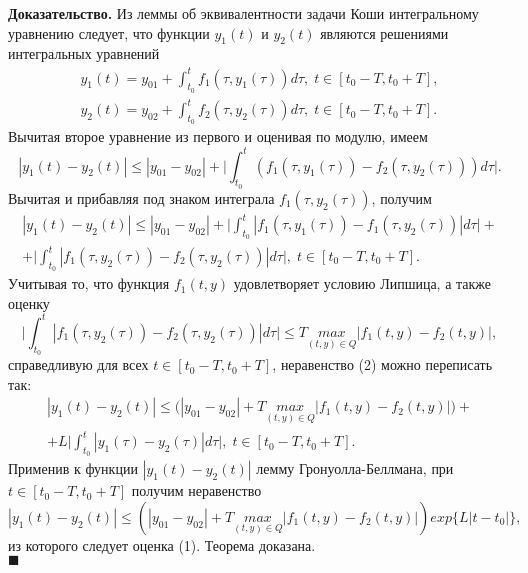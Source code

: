 \textbf{Доказательство.} Из леммы об эквивалентности задачи Коши интегральному уравнению следует, что функции $y_1(t)$ и $y_2(t)$ являются решениями интегральных уравнений
\begin{equation*}
\begin{split}
y_1(t)=y_{01}+\int_{t_0}^t f_1(\tau , y_1(\tau))d\tau , \;t\in [t_0-T, t_0+T],\\
y_2(t)=y_{02}+\int_{t_0}^t f_2(\tau , y_2(\tau))d\tau , \;t\in [t_0-T, t_0+T].
\end{split}
\end{equation*}
Вычитая второе уравнение из первого и оценивая по модулю, имеем
\begin{equation*}
|y_1(t)-y_2(t)|\leq |y_{01}-y_{02}|+\big| \int_{t_0}^t (f_1(\tau , y_1(\tau))- f_2(\tau , y_2(\tau)))d\tau \big|.
\end{equation*}
Вычитая и прибавляя под знаком интеграла $f_1(\tau,y_2(\tau))$, получим
\begin{equation*}\tag{2}
\begin{split}
|y_1(t)-y_2(t)|\leq |y_{01}-y_{02}|+\big| \int_{t_0}^t |f_1(\tau , y_1(\tau))- f_1(\tau , y_2(\tau))|d\tau \big| +\\
+\big| \int_{t_0}^t |f_1(\tau , y_2(\tau))- f_2(\tau , y_2(\tau))|d\tau \big|,\; t\in [t_0-T, t_0+T].    
\end{split}
\end{equation*}
Учитывая то, что функция $f_1(t,y)$ удовлетворяет условию Липшица, а также оценку
\begin{equation*}
\big| \int_{t_0}^t |f_1(\tau , y_2(\tau))- f_2(\tau , y_2(\tau))|d\tau \big|\leq T \underset{(t,y)\in Q}{max} |f_1(t,y)-f_2(t,y)|,
\end{equation*}
справедливую для всех $t\in [t_0-T,t_0+T]$, неравенство (2) можно переписать так:
\begin{equation*}
\begin{split}
|y_1(t)-y_2(t)|\leq \big( |y_{01}-y_{02}|+  T \underset{(t,y)\in Q}{max} |f_1(t,y)-f_2(t,y)|\big)+\\
+L \big| \int_{t_0}^t |y_1(\tau)- y_2(\tau)|d\tau \big|, \;t\in [t_0-T,t_0+T].
\end{split}
\end{equation*}
Применив к функции $|y_1(t)-y_2(t)|$ лемму Гронуолла-Беллмана, при $t\in [t_0-T,t_0+T]$ получим неравенство
\begin{equation*}
|y_1(t)-y_2(t)|\leq (|y_{01}-y_{02}|+  T \underset{(t,y)\in Q}{max} |f_1(t,y)-f_2(t,y)|) exp\{L|t-t_0|\},
\end{equation*}
из которого следует оценка (1). Теорема доказана. \\$\blacksquare$

